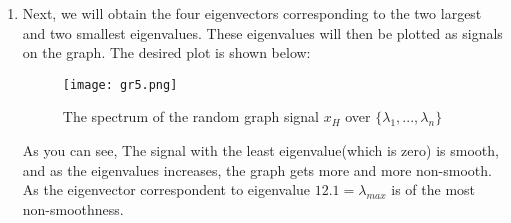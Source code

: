 \documentclass{article}
\begin{document}
\begin{enumerate}
\begin{lstlisting}
    \end{lstlisting}

    
    \item Next, we will obtain the four eigenvectors corresponding to the two largest and two smallest eigenvalues. These eigenvalues will then be plotted as signals on the graph. The desired plot is shown below:


    \begin{figure}[h!]
        \centering
        \texttt{[image: gr5.png]} %
        \caption{The spectrum of the random graph signal $x_H$ over $\{\lambda_1, ...,\lambda_n\}$}
        \label{fig:gr5}
    \end{figure} 

    As you can see, The signal with the least eigenvalue(which is zero) is smooth, and as the eigenvalues increases, the graph gets more and more non-smooth. As the eigenvector correspondent to eigenvalue $12.1=\lambda_{max}$ is of the most non-smoothness.
\end{enumerate}
\maketitle
\end{document}

